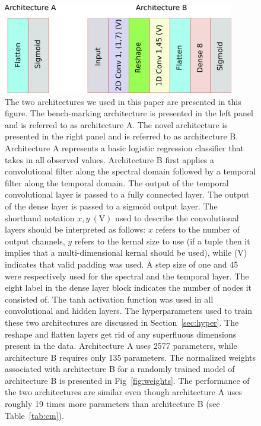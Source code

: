 \documentclass{article}
\begin{document}

\begin{figure}
\includegraphics[width=0.9\textwidth]{Architectures.pdf} 
\caption{The two architectures we used in this paper are presented in this figure. The bench-marking architecture is presented in the left panel and is referred to as architecture A. The novel architecture is presented in the right panel and is referred to as architecture B. Architecture A represents a basic logistic regression classifier that takes in all observed values. Architecture B first applies a convolutional filter along the spectral domain followed by a temporal filter along the temporal domain. The output of the temporal convolutional layer is passed to a fully connected layer. The output of the dense layer is passed to a sigmoid output layer. The shorthand notation $x, y~(\textrm{V})$ used to describe the convolutional layers should be interpreted as follows: $x$ refers to the number of output channels, $y$ refers to the kernal size to use (if a tuple then it implies that a multi-dimensional kernal should be used), while (V) indicates that valid padding was used. A step size of one and 45 were respectively used for the spectral and the temporal layer. The eight label in the dense layer block indicates the number of nodes it consisted of. The tanh activation function was used in all convolutional and hidden layers. The hyperparameters used to train these two architectures are discussed in Section~\ref{sec:hyper}. The reshape and flatten layers get rid of any superfluous dimensions present in the data. Architecture A uses 2577 parameters, while architecture B requires only 135 parameters. The normalized weights associated with architecture B for a randomly trained model of architecture B is presented in Fig~\ref{fig:weights}. The performance of the two architectures are similar even though architecture A uses roughly 19 times more parameters than architecture B (see Table~\ref{tab:cm}).}
\label{fig:ach}

\end{figure}
\end{document}
